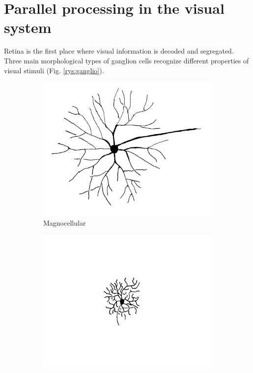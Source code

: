 \documentclass{pracalicmgr}
\begin{document}
   \section{Parallel processing in the visual system}
    Retina is the first place where visual information is decoded and segregated. Three main morphological types of ganglion cells recognize different properties of visual stimuli (Fig. \ref{rys:ganglio}).

	\begin{figure}[H]
	\begin{subfigure}{.33\textwidth}
		\centering
		\includegraphics[width=1.\linewidth]{cell_M2.png}
		\caption{Magnocellular}
		\label{rys:magno}
	\end{subfigure}%
	\begin{subfigure}{.33\textwidth}
		\centering
		\includegraphics[width=1\linewidth]{cell_P2.png}

\end{subfigure}
\end{figure}
\end{document}
